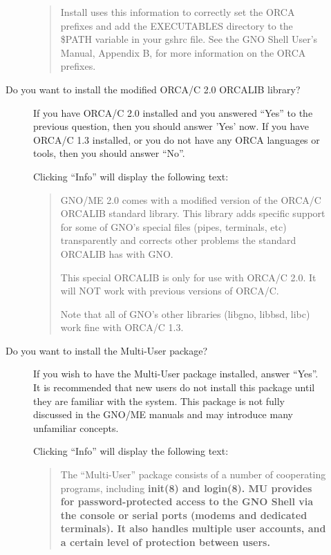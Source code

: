\documentclass{report}
\begin{document}
\begin{description}
\begin{description}
\begin{quote}
	Install uses this information to correctly set the ORCA prefixes
	and add the EXECUTABLES directory to the \$PATH variable in your
	gshrc file.  See the GNO Shell User's Manual, Appendix B, for
	more information on the ORCA prefixes.

	\end{quote}

\item[Do you want to install the modified ORCA/C 2.0 ORCALIB library?]

If you have ORCA/C 2.0 installed and you answered ``Yes'' to the
previous question, then you should answer 'Yes' now.
If you have ORCA/C 1.3 installed, or you do not have any ORCA languages or
tools, then you should answer ``No''.

Clicking ``Info'' will display the following text:

	\begin{quote}

	GNO/ME 2.0 comes with a modified version of the ORCA/C ORCALIB
	standard library. This library adds specific support for some of
        GNO's special files (pipes, terminals, etc) transparently
        and corrects other problems the standard ORCALIB has with
        GNO.
        
	This special ORCALIB is only for use with ORCA/C 2.0. It will
	NOT work with previous versions of ORCA/C.
        

	Note that all of GNO's other libraries (libgno, libbsd, libc)
	work fine with ORCA/C 1.3.

	\end{quote}

\item[Do you want to install the Multi-User package?]

If you wish to have the Multi-User package installed, answer ``Yes''.
It is recommended that new users do not install this package until they are
familiar with the system. This package is not fully discussed in the
GNO/ME manuals and may introduce many unfamiliar concepts.

Clicking ``Info'' will display the following text:

	\begin{quote}

	The ``Multi-User'' package consists of a number of
	cooperating programs, including \bf init\rm(8) and \bf login\rm(8).
	MU provides for password-protected access to the GNO Shell via the
        console or serial ports (modems and dedicated terminals).
        It also handles multiple user accounts, and a certain
        level of protection between users. 


\end{quote}
\end{description}
\end{description}
\end{document}
